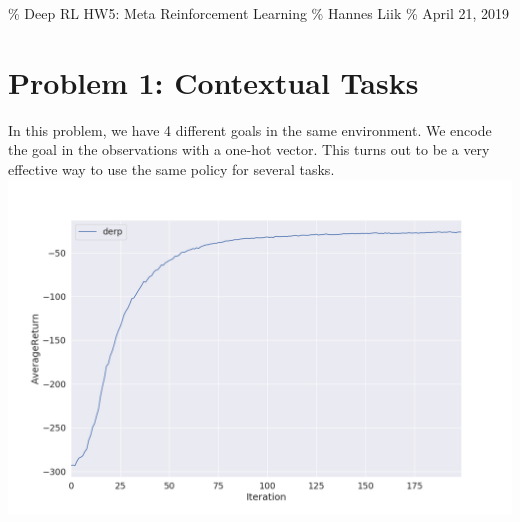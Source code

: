 \% Deep RL HW5: Meta Reinforcement Learning \% Hannes Liik \% April 21,
2019

\section{Problem 1: Contextual Tasks}\label{problem-1-contextual-tasks}

In this problem, we have 4 different goals in the same environment. We
encode the goal in the observations with a one-hot vector. This turns
out to be a very effective way to use the same policy for several tasks.
\includegraphics{ex1.png}
